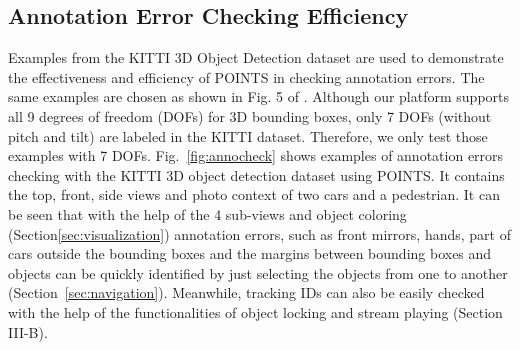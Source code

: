 \documentclass[letterpaper, 10 pt, conference]{ieeeconf}  %
\begin{document}
\subsection{Annotation Error Checking Efficiency}
Examples from the KITTI 3D Object Detection dataset \cite{Geiger2012CVPR} are used to demonstrate the effectiveness and efficiency of POINTS in checking annotation errors. 
The same examples are chosen as shown in Fig. 5 of \cite{pointatme}. 
Although our platform supports all 9 degrees of freedom (DOFs) for 3D bounding boxes, only 7 DOFs (without pitch and tilt) are labeled in the KITTI dataset.
Therefore, we only test those examples with 7 DOFs.
Fig.~\ref{fig:annocheck} shows examples of annotation errors checking with the KITTI 3D object detection dataset using POINTS. 
It contains the top, front, side views and photo context of two cars and a pedestrian.
It can be seen that with the help of the 4 sub-views and object coloring (Section\ref{sec:visualization}) 
annotation errors, such as front mirrors, hands, part of cars outside the bounding boxes and the margins between bounding boxes and objects
can be quickly identified by just selecting the objects from one to another (Section~\ref{sec:navigation}).
Meanwhile, tracking IDs can also be easily checked with the help of the functionalities of object locking and stream playing (Section III-B).
\end{document}

